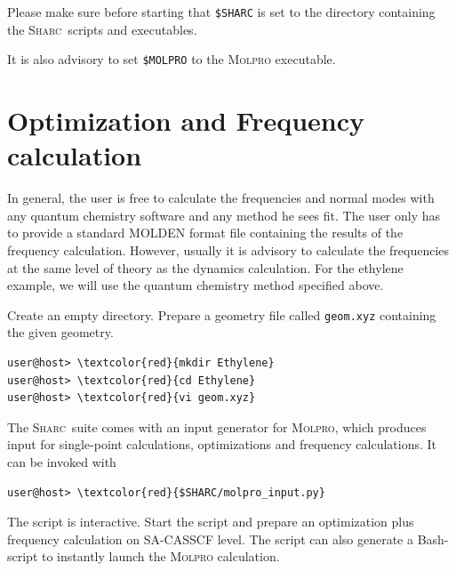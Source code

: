 \documentclass[a4paper,11pt,DIV=15,openany]{scrbook}
\newcommand{\sharc}{\textsc{Sharc}}
\newcommand{\ttt}[1]{\texttt{#1}}
\newenvironment{example}{
  \vspace{0mm}
  \definecolor{shadecolor}{HTML}{BBDDFF}
  \begin{shaded}
  \begin{minipage}{0.9\textwidth}
}{
  \end{minipage}
  \end{shaded}
}
\begin{document}
\begin{example}
  Please make sure before starting that \ttt{\$SHARC} is set to the directory containing the \sharc\ scripts and executables.

  It is also advisory to set \ttt{\$MOLPRO} to the \textsc{Molpro} executable.
\end{example}




\section{Optimization and Frequency calculation}

In general, the user is free to calculate the frequencies and normal modes with any quantum chemistry software and any method he sees fit. The user only has to provide a standard MOLDEN format file containing the results of the frequency calculation. However, usually it is advisory to calculate the frequencies at the same level of theory as the dynamics calculation. For the ethylene example, we will use the quantum chemistry method specified above. 

Create an empty directory. Prepare a geometry file called \ttt{geom.xyz} containing the given geometry.
\begin{Verbatim}[commandchars=\\\{\}]
user@host> \textcolor{red}{mkdir Ethylene}
user@host> \textcolor{red}{cd Ethylene}
user@host> \textcolor{red}{vi geom.xyz}
\end{Verbatim}

The \sharc\ suite comes with an input generator for \textsc{Molpro}, which produces input for single-point calculations, optimizations and frequency calculations. It can be invoked with
\begin{Verbatim}[commandchars=\\\{\}]
user@host> \textcolor{red}{$SHARC/molpro_input.py}
\end{Verbatim}
The script is interactive. Start the script and prepare an optimization plus frequency calculation on SA-CASSCF level. The script can also generate a Bash-script to instantly launch the \textsc{Molpro} calculation.
\end{document}
